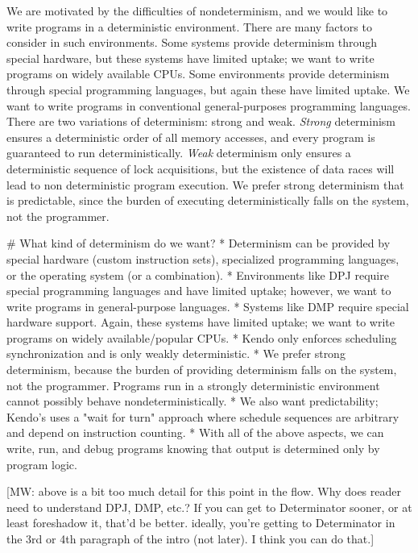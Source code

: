 \fi

We are motivated by the difficulties of nondeterminism, and we would like to
write programs in a deterministic environment.
There are many factors to consider in such environments.
Some systems provide determinism through special
hardware, but these systems have limited uptake; we want to write programs
on widely available CPUs. Some environments provide determinism through
special programming languages, but again these have limited uptake. We want to
write programs in conventional general-purposes programming languages. There are
two variations of determinism: strong and weak. \emph{Strong} determinism
ensures a deterministic order of all memory accesses, and every program is
guaranteed to run deterministically. \emph{Weak} determinism only ensures a
deterministic sequence of lock acquisitions, but the existence of data races
will lead to non deterministic program execution. We prefer strong determinism
that is predictable, since the burden of executing deterministically falls on
the system, not the programmer.

\iffalse

# What kind of determinism do we want?
* Determinism can be provided by special hardware (custom instruction sets),
  specialized programming languages, or the operating system (or a
  combination).
* Environments like DPJ require special programming languages and have limited
  uptake; however, we want to write programs in general-purpose languages.
* Systems like DMP require special hardware support. Again, these systems have
  limited uptake; we want to write programs on widely available/popular CPUs.
* Kendo only enforces scheduling synchronization and is only weakly
  deterministic.
* We prefer strong determinism, because the burden of providing determinism
  falls on the system, not the programmer. Programs run in a strongly
  deterministic environment cannot possibly behave nondeterministically.
* We also want predictability; Kendo's uses a "wait for turn" approach where
  schedule sequences are arbitrary and depend on instruction counting.
* With all of the above aspects, we can write, run, and debug programs knowing
  that output is determined only by program logic.

[MW: above is a bit too much detail for this point in the flow. Why does
reader need to understand DPJ, DMP, etc.? If you can get to Determinator
sooner, or at least foreshadow it, that'd be better. ideally, you're
getting to Determinator in the 3rd or 4th paragraph of the intro (not
later). I think you can do that.]

